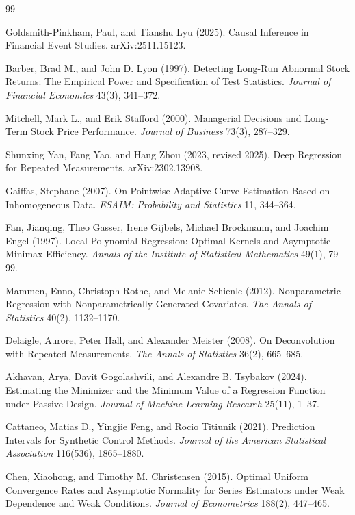 \documentclass{article}
\begin{document}
\begin{thebibliography}{99}

   Goldsmith-Pinkham, Paul, and Tianshu Lyu (2025). Causal Inference in Financial Event Studies. arXiv:2511.15123.

   Barber, Brad M., and John D. Lyon (1997). Detecting Long-Run Abnormal Stock Returns: The Empirical Power and Specification of Test Statistics. \emph{Journal of Financial Economics} 43(3), 341--372.

   Mitchell, Mark L., and Erik Stafford (2000). Managerial Decisions and Long-Term Stock Price Performance. \emph{Journal of Business} 73(3), 287--329.

   Shunxing Yan, Fang Yao, and Hang Zhou (2023, revised 2025). Deep Regression for Repeated Measurements. arXiv:2302.13908.

   Gaiffas, Stephane (2007). On Pointwise Adaptive Curve Estimation Based on Inhomogeneous Data. \emph{ESAIM: Probability and Statistics} 11, 344--364.

   Fan, Jianqing, Theo Gasser, Irene Gijbels, Michael Brockmann, and Joachim Engel (1997). Local Polynomial Regression: Optimal Kernels and Asymptotic Minimax Efficiency. \emph{Annals of the Institute of Statistical Mathematics} 49(1), 79--99.

   Mammen, Enno, Christoph Rothe, and Melanie Schienle (2012). Nonparametric Regression with Nonparametrically Generated Covariates. \emph{The Annals of Statistics} 40(2), 1132--1170.

   Delaigle, Aurore, Peter Hall, and Alexander Meister (2008). On Deconvolution with Repeated Measurements. \emph{The Annals of Statistics} 36(2), 665--685.

   Akhavan, Arya, Davit Gogolashvili, and Alexandre B. Tsybakov (2024). Estimating the Minimizer and the Minimum Value of a Regression Function under Passive Design. \emph{Journal of Machine Learning Research} 25(11), 1--37.

   Cattaneo, Matias D., Yingjie Feng, and Rocio Titiunik (2021). Prediction Intervals for Synthetic Control Methods. \emph{Journal of the American Statistical Association} 116(536), 1865--1880.

   Chen, Xiaohong, and Timothy M. Christensen (2015). Optimal Uniform Convergence Rates and Asymptotic Normality for Series Estimators under Weak Dependence and Weak Conditions. \emph{Journal of Econometrics} 188(2), 447--465.


\end{thebibliography}
\end{document}
